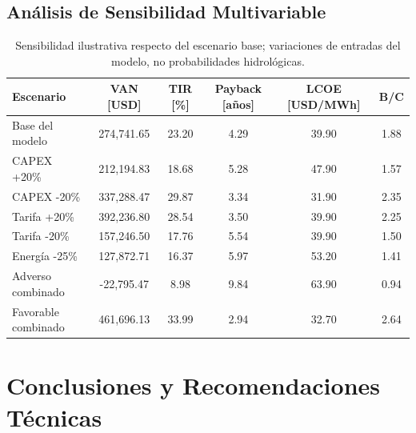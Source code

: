 \documentclass[11pt,a4paper]{report}
\begin{document}
\section{Análisis de Sensibilidad Multivariable}
\begin{table}[H]
\centering
\small
\begin{tabular}{lccccc}
\toprule
\textbf{Escenario} & \textbf{VAN [USD]} & \textbf{TIR [\%]} & \textbf{Payback [años]} & \textbf{LCOE [USD/MWh]} & \textbf{B/C} \\
\midrule
Base del modelo & 274,741.65 & 23.20 & 4.29 & 39.90 & 1.88 \\
CAPEX +20\% & 212,194.83 & 18.68 & 5.28 & 47.90 & 1.57 \\
CAPEX -20\% & 337,288.47 & 29.87 & 3.34 & 31.90 & 2.35 \\
Tarifa +20\% & 392,236.80 & 28.54 & 3.50 & 39.90 & 2.25 \\
Tarifa -20\% & 157,246.50 & 17.76 & 5.54 & 39.90 & 1.50 \\
Energía -25\% & 127,872.71 & 16.37 & 5.97 & 53.20 & 1.41 \\
Adverso combinado & -22,795.47 & 8.98 & 9.84 & 63.90 & 0.94 \\
Favorable combinado & 461,696.13 & 33.99 & 2.94 & 32.70 & 2.64 \\
\bottomrule
\end{tabular}
\caption{Sensibilidad ilustrativa respecto del escenario base; variaciones de entradas del modelo, no probabilidades hidrológicas.}
\label{tab:sensibilidad}
\end{table}

\chapter{Conclusiones y Recomendaciones Técnicas}
\end{document}
